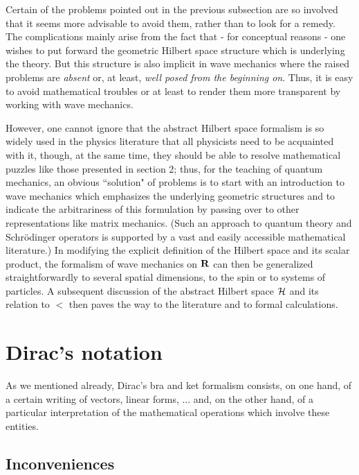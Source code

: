 \documentclass[a4wide,12pt]{report}
\begin{document}
Certain of the problems pointed out in the previous subsection 
are so involved that it seems more advisable to avoid them, rather 
than to 
look for a remedy. The complications mainly arise from the fact that 
- for conceptual reasons - one wishes to put forward 
the geometric Hilbert space structure which is underlying the theory.
But this structure is also implicit in wave mechanics
where the raised problems are {\em absent} or, at least,  
{\em well posed from the beginning on}. 
Thus, it is easy to avoid mathematical troubles or at least 
to render them more transparent by working with wave mechanics. 

However, one cannot ignore that 
the abstract Hilbert space formalism is 
so widely used in the physics literature 
that all physicists need to be acquainted  
with it, though, at the same time, they should 
be able to resolve mathematical puzzles like 
those  presented in section 2; 
thus,  for the teaching of quantum mechanics, an obvious 
``solution" of problems is to start with an introduction 
to wave mechanics which emphasizes the underlying geometric 
structures and to indicate the arbitrariness of this formulation 
by passing over to other representations like matrix mechanics.
(Such an approach to quantum theory and Schr\"odinger operators 
is supported by a vast and easily accessible 
mathematical literature.)
In modifying the explicit definition of the Hilbert space and its 
scalar product, the formalism of wave mechanics on  ${\bf R}$
can then be generalized straightforwardly
to several spatial dimensions, 
to the spin or to systems of particles.
A subsequent discussion of the abstract Hilbert space ${\cal H}$ 
and its relation to $\lt$ then paves the way to the literature
and to formal calculations. 



 
 
 
\section{Dirac's notation}
 
As we mentioned already, Dirac's bra and ket formalism 
consists, on one hand, of a certain writing of vectors, linear forms, ...
and, on the other hand, of a particular interpretation of the 
mathematical operations which involve these entities. 

 
 
\subsection{Inconveniences}
\end{document}
